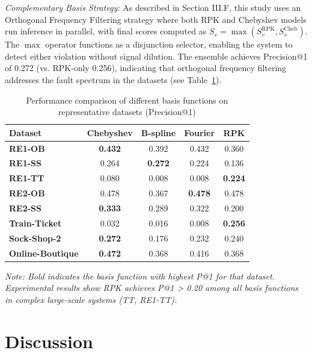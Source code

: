 \documentclass[conference]{IEEEtran}
\begin{document}
\textit{Complementary Basis Strategy:} As described in Section III.F, this study uses an Orthogonal Frequency Filtering strategy where both RPK and Chebyshev models run inference in parallel, with final scores computed as $S_v = \max(S_v^{\text{RPK}}, S_v^{\text{Cheb}})$. The $\max$ operator functions as a disjunction selector, enabling the system to detect either violation without signal dilution. The ensemble achieves Precision@1 of 0.272 (vs. RPK-only 0.256), indicating that orthogonal frequency filtering addresses the fault spectrum in the datasets (see Table~\ref{tab:basis_comparison}).

\begin{table}[htbp]
\centering
\caption{Performance comparison of different basis functions on representative datasets (Precision@1)}
\label{tab:basis_comparison}
\footnotesize
\renewcommand{\arraystretch}{0.85}
\setlength{\tabcolsep}{2.5pt}
\begin{tabular}{l|cccc}
\toprule
\textbf{Dataset} & \textbf{Chebyshev} & \textbf{B-spline} & \textbf{Fourier} & \textbf{RPK} \\
\midrule
\textbf{RE1-OB} & \textbf{0.432} & 0.392 & 0.432 & 0.360 \\
\textbf{RE1-SS} & 0.264 & \textbf{0.272} & 0.224 & 0.136 \\
\textbf{RE1-TT} & 0.080 & 0.008 & 0.008 & \textbf{0.224} \\
\midrule
\textbf{RE2-OB} & 0.478 & 0.367 & \textbf{0.478} & 0.478 \\
\textbf{RE2-SS} & \textbf{0.333} & 0.289 & 0.322 & 0.200 \\
\midrule
\textbf{Train-Ticket} & 0.032 & 0.016 & 0.008 & \textbf{0.256} \\
\textbf{Sock-Shop-2} & \textbf{0.272} & 0.176 & 0.232 & 0.240 \\
\textbf{Online-Boutique} & \textbf{0.472} & 0.368 & 0.416 & 0.368 \\
\bottomrule
\end{tabular}
\vspace{0.2cm}

\footnotesize \textit{Note: Bold indicates the basis function with highest P@1 for that dataset. Experimental results show RPK achieves P@1 > 0.20 among all basis functions in complex large-scale systems (TT, RE1-TT).}
\end{table}

\section{Discussion}
\end{document}
